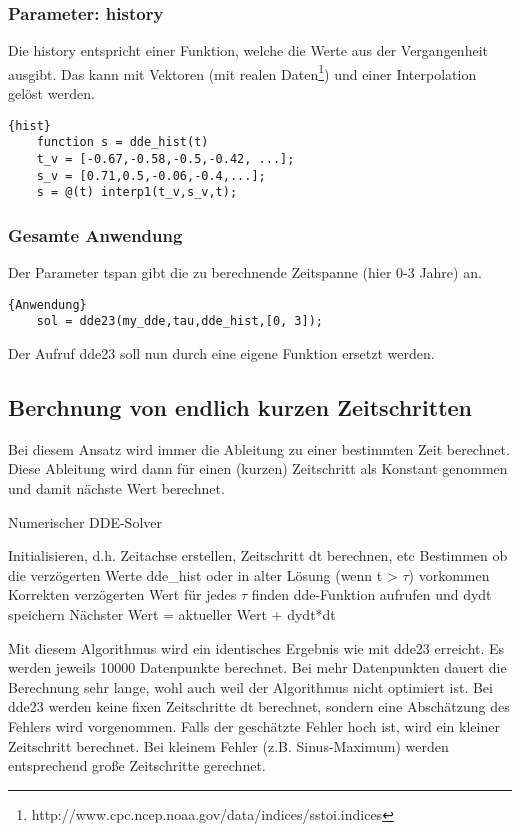 \subsubsection{Parameter: history}
Die history entspricht einer Funktion, welche die Werte aus der Vergangenheit ausgibt. 
Das kann mit Vektoren (mit realen Daten\footnote{http://www.cpc.ncep.noaa.gov/data/indices/sstoi.indices}) und einer Interpolation gelöst werden.
\begin{lstlisting}{hist}
	function s = dde_hist(t)
	t_v = [-0.67,-0.58,-0.5,-0.42, ...];
	s_v = [0.71,0.5,-0.06,-0.4,...];  
	s = @(t) interp1(t_v,s_v,t);
\end{lstlisting}

\subsubsection{Gesamte Anwendung}
Der Parameter tspan gibt die zu berechnende Zeitspanne (hier 0-3 Jahre) an.
\begin{lstlisting}{Anwendung}
	sol = dde23(my_dde,tau,dde_hist,[0, 3]);
\end{lstlisting}
Der Aufruf dde23 soll nun durch eine eigene Funktion ersetzt werden.
 

\subsection{Berchnung von endlich kurzen Zeitschritten}
Bei diesem Ansatz wird immer die Ableitung zu einer bestimmten Zeit berechnet.
Diese Ableitung wird dann für einen (kurzen) Zeitschritt als Konstant genommen und damit nächste Wert berechnet.
\begin{algorithm}
	\caption{Numerischer DDE-Solver}
	\label{algo1}
	\begin{algorithmic}[1]
		\State Initialisieren, d.h. Zeitachse erstellen, Zeitschritt dt berechnen, etc
		\State Bestimmen ob die verzögerten Werte dde\_hist oder in alter Lösung (wenn t > $\tau$) vorkommen
		\State Korrekten verzögerten Wert für jedes $\tau$ finden
		\EndFor
		\State dde-Funktion aufrufen und dydt speichern
		\State Nächster Wert = aktueller Wert + dydt*dt
		\EndFor
	\end{algorithmic}
\end{algorithm}

Mit diesem Algorithmus wird ein identisches Ergebnis wie mit dde23 erreicht. 
Es werden jeweils 10000 Datenpunkte berechnet. 
Bei mehr Datenpunkten dauert die Berechnung sehr lange, wohl auch weil der Algorithmus nicht optimiert ist.
Bei dde23 werden keine fixen Zeitschritte dt berechnet, sondern eine Abschätzung des Fehlers wird vorgenommen.
Falls der geschätzte Fehler hoch ist, wird ein kleiner Zeitschritt berechnet. 
Bei kleinem Fehler (z.B. Sinus-Maximum) werden entsprechend große Zeitschritte gerechnet. %


